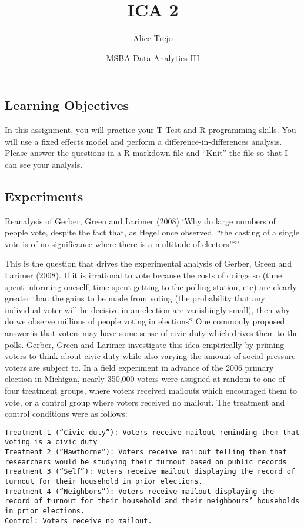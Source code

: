 \documentclass[
]{article}
\title{ICA 2}
\author{Alice Trejo}
\date{MSBA Data Analytics III}
\begin{document}
\maketitle

\hypertarget{learning-objectives}{%
\subsection{Learning Objectives}\label{learning-objectives}}

In this assignment, you will practice your T-Test and R programming
skills. You will use a fixed effects model and perform a
difference-in-differences analysis. Please answer the questions in a R
markdown file and ``Knit'' the file so that I can see your analysis.

\hypertarget{experiments}{%
\subsection{Experiments}\label{experiments}}

Reanalysis of Gerber, Green and Larimer (2008) `Why do large numbers of
people vote, despite the fact that, as Hegel once observed, ``the
casting of a single vote is of no significance where there is a
multitude of electors''?'

This is the question that drives the experimental analysis of Gerber,
Green and Larimer (2008). If it is irrational to vote because the costs
of doings so (time spent informing oneself, time spent getting to the
polling station, etc) are clearly greater than the gains to be made from
voting (the probability that any individual voter will be decisive in an
election are vanishingly small), then why do we observe millions of
people voting in elections? One commonly proposed answer is that voters
may have some sense of civic duty which drives them to the polls.
Gerber, Green and Larimer investigate this idea empirically by priming
voters to think about civic duty while also varying the amount of social
pressure voters are subject to. In a field experiment in advance of the
2006 primary election in Michigan, nearly 350,000 voters were assigned
at random to one of four treatment groups, where voters received
mailouts which encouraged them to vote, or a control group where voters
received no mailout. The treatment and control conditions were as
follows:

\begin{verbatim}
Treatment 1 (“Civic duty”): Voters receive mailout reminding them that voting is a civic duty
Treatment 2 (“Hawthorne”): Voters receive mailout telling them that researchers would be studying their turnout based on public records
Treatment 3 (“Self”): Voters receive mailout displaying the record of turnout for their household in prior elections.
Treatment 4 (“Neighbors”): Voters receive mailout displaying the record of turnout for their household and their neighbours’ households in prior elections.
Control: Voters receive no mailout.
\end{verbatim}
\end{document}
